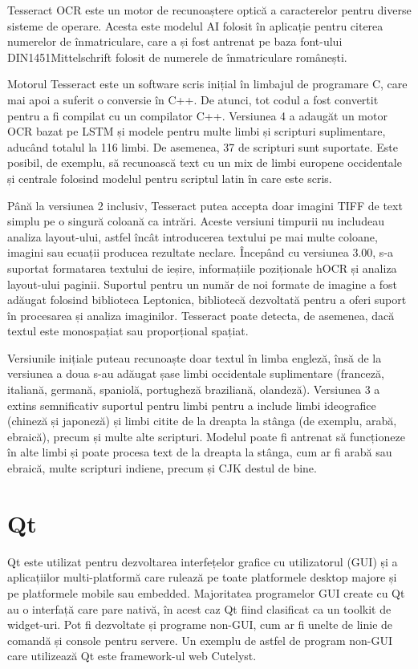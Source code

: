 \documentclass[a4paper,12pt]{report}
\begin{document}
Tesseract OCR este un motor de recunoaștere optică a caracterelor pentru diverse sisteme de operare. Acesta este modelul AI folosit în aplicație pentru citerea numerelor de înmatriculare, care a și fost antrenat pe baza font-ului DIN1451Mittelschrift folosit de numerele de înmatriculare românești.

Motorul Tesseract este un software scris inițial în limbajul de programare C, care mai apoi a suferit o conversie în C++. De atunci, tot codul a fost convertit pentru a fi compilat cu un compilator C++. Versiunea 4 a adaugăt un motor OCR bazat pe LSTM și modele pentru multe limbi și scripturi suplimentare, aducând totalul la 116 limbi. De asemenea, 37 de scripturi sunt suportate. Este posibil, de exemplu, să recunoască text cu un mix de limbi europene occidentale și centrale folosind modelul pentru scriptul latin în care este scris.

Până la versiunea 2 inclusiv, Tesseract putea accepta doar imagini TIFF de text simplu pe o singură coloană ca intrări. Aceste versiuni timpurii nu includeau analiza layout-ului, astfel încât introducerea textului pe mai multe coloane, imagini sau ecuații producea rezultate neclare. Începând cu versiunea 3.00, s-a suportat formatarea textului de ieșire, informațiile poziționale hOCR și analiza layout-ului paginii. Suportul pentru un număr de noi formate de imagine a fost adăugat folosind biblioteca Leptonica, bibliotecă dezvoltată pentru a oferi suport în procesarea și analiza imaginilor. Tesseract poate detecta, de asemenea, dacă textul este monospațiat sau proporțional spațiat.

Versiunile inițiale puteau recunoaște doar textul în limba engleză, însă de la versiunea a doua s-au adăugat șase limbi occidentale suplimentare (franceză, italiană, germană, spaniolă, portugheză braziliană, olandeză). Versiunea 3 a extins semnificativ suportul pentru limbi pentru a include limbi ideografice (chineză și japoneză) și limbi citite de la dreapta la stânga (de exemplu, arabă, ebraică), precum și multe alte scripturi. Modelul poate fi antrenat să funcționeze în alte limbi și poate procesa text de la dreapta la stânga, cum ar fi arabă sau ebraică, multe scripturi indiene, precum și CJK destul de bine.

\section{Qt}
Qt este utilizat pentru dezvoltarea interfețelor grafice cu utilizatorul (GUI) și a aplicațiilor multi-platformă care rulează pe toate platformele desktop majore și pe platformele mobile sau embedded. Majoritatea programelor GUI create cu Qt au o interfață care pare nativă, în acest caz Qt fiind clasificat ca un toolkit de widget-uri. Pot fi dezvoltate și programe non-GUI, cum ar fi unelte de linie de comandă și console pentru servere. Un exemplu de astfel de program non-GUI care utilizează Qt este framework-ul web Cutelyst.
\end{document}
